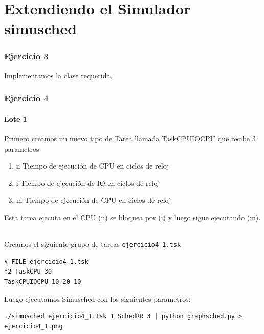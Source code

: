 


\part{Extendiendo el Simulador simusched}

\section{Ejercicio 3}

Implementamos la clase requerida.

\section{Ejercicio 4}

\subsection{Lote 1}

Primero creamos un nuevo tipo de Tarea llamada TaskCPUIOCPU que recibe 3 parametros:

\begin{enumerate}
 \item n Tiempo de ejecuci\'on de CPU en ciclos de reloj
 \item i Tiempo de ejecuci\'on de IO en ciclos de reloj
 \item m Tiempo de ejecuci\'on de CPU en ciclos de reloj
\end{enumerate}

Esta tarea ejecuta en el CPU (n) se bloquea por (i) y luego sigue ejecutando (m).

\paragraph{}
Creamos el siguiente grupo de tareas \verb|ejercicio4_1.tsk|

\begin{framed}
\begin{verbatim}
# FILE ejercicio4_1.tsk
*2 TaskCPU 30
TaskCPUIOCPU 10 20 10
\end{verbatim}
\end{framed}

Luego ejecutamos Simusched con los siguientes parametros:

\begin{framed}
\begin{verbatim}
./simusched ejercicio4_1.tsk 1 SchedRR 3 | python graphsched.py > ejercicio4_1.png
\end{verbatim}
\end{framed}

